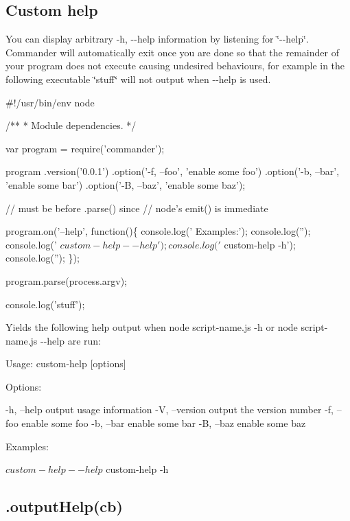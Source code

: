 \subsection*{Custom help}

You can display arbitrary {\ttfamily -\/h, -\/-\/help} information by listening for \char`\"{}-\/-\/help\char`\"{}. Commander will automatically exit once you are done so that the remainder of your program does not execute causing undesired behaviours, for example in the following executable \char`\"{}stuff\char`\"{} will not output when {\ttfamily -\/-\/help} is used.


\begin{DoxyCode}
#!/usr/bin/env node

/**
 * Module dependencies.
 */

var program = require('commander');

program
  .version('0.0.1')
  .option('-f, --foo', 'enable some foo')
  .option('-b, --bar', 'enable some bar')
  .option('-B, --baz', 'enable some baz');

// must be before .parse() since
// node's emit() is immediate

program.on('--help', function()\{
  console.log('  Examples:');
  console.log('');
  console.log('    $ custom-help --help');
  console.log('    $ custom-help -h');
  console.log('');
\});

program.parse(process.argv);

console.log('stuff');
\end{DoxyCode}


Yields the following help output when {\ttfamily node script-\/name.\+js -\/h} or {\ttfamily node script-\/name.\+js -\/-\/help} are run\+:


\begin{DoxyCode}
Usage: custom-help [options]

Options:

  -h, --help     output usage information
  -V, --version  output the version number
  -f, --foo      enable some foo
  -b, --bar      enable some bar
  -B, --baz      enable some baz

Examples:

  $ custom-help --help
  $ custom-help -h
\end{DoxyCode}


\subsection*{.output\+Help(cb)}

